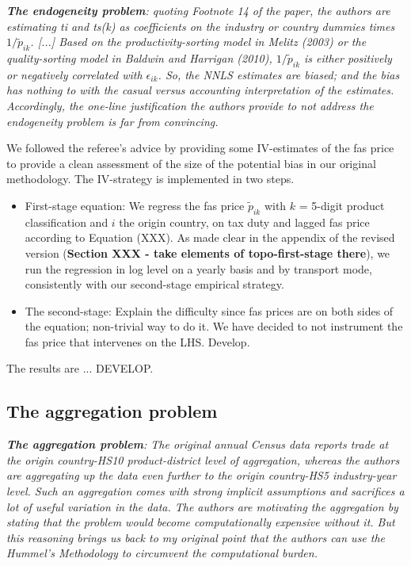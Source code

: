 \documentclass[a4paper,12pt]{article}
\begin{document}
\textit{\textbf{The endogeneity problem}: quoting Footnote 14 of the paper, the authors
are estimating ti and ts(k) as coefficients on the industry or country
dummies times $1/\widetilde{p}_{ik}$. [...] Based on the productivity-sorting model in Melitz (2003) or the quality-sorting
model in Baldwin and Harrigan (2010),  $1/\widetilde{p}_{ik}$ is either positively
or negatively correlated with $\epsilon_{ik}$. So, the NNLS estimates are biased; and
the bias has nothing to with the casual versus accounting interpretation of
the estimates. Accordingly, the one-line justification the authors provide
to not address the endogeneity problem is far from convincing.}


We followed the referee's advice by providing some IV-estimates of the fas price to provide a clean assessment of the size of the potential bias in our original methodology. The IV-strategy is implemented in two steps.

\begin{itemize}
\item First-stage equation: We regress the fas price $\widetilde{p}_{ik}$ with $k$ = 5-digit product classification and $i$ the origin country, on tax duty and lagged fas price according to Equation (XXX). As made clear in the appendix of the revised version (\textbf{Section XXX - take elements of topo-first-stage there}), we run the regression in log level on a yearly basis and by transport mode, consistently with our second-stage empirical strategy.

\item The second-stage: Explain the difficulty since fas prices are on both sides of the equation; non-trivial way to do it. We have decided to not instrument the fas price that intervenes on the LHS. Develop.




\end{itemize}

The results are ... DEVELOP.

\subsection{The aggregation problem}

\textit{\textbf{The aggregation problem}: The original annual Census data reports
trade at the origin country-HS10 product-district level of aggregation,
whereas the authors are aggregating up the data even further to the origin
country-HS5 industry-year level. Such an aggregation comes with strong implicit assumptions and sacrifices a lot of useful variation in the data.
The authors are motivating the aggregation by stating that the problem
would become computationally expensive without it. But this reasoning
brings us back to my original point that the authors can use the Hummel's
Methodology to circumvent the computational burden.}
\end{document}
